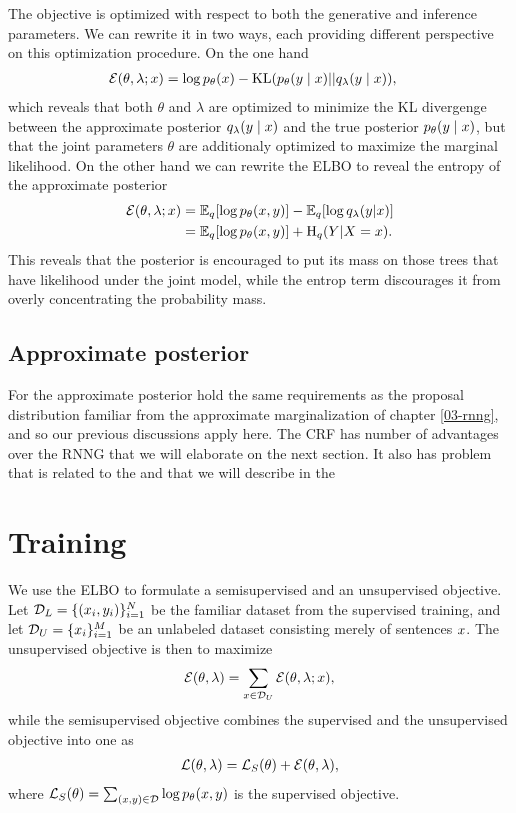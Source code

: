     The objective is optimized with respect to both the generative and inference parameters. We can rewrite it in two ways, each providing different perspective on this optimization procedure. On the one hand
    \begin{align*}
      \operatorname{\mathcal{E}}(\theta, \lambda; x) &= \log p_{\theta}(x) - \operatorname{KL}(p_{\theta}(y \mid x) \rvert\lvert q_{\lambda}(y \mid x)),
    \end{align*}
    which reveals that both $\theta$ and $\lambda$ are optimized to minimize the KL divergenge between the approximate posterior $q_{\lambda}(y \mid x)$ and the true posterior $p_{\theta}(y \mid x)$, but that the joint parameters $\theta$ are additionaly optimized to maximize the marginal likelihood. On the other hand we can rewrite the ELBO to reveal the entropy of the approximate posterior
    \begin{align}
      \operatorname{\mathcal{E}}(\theta, \lambda; x)
        &= \operatorname{\mathbb{E}}_q [ \log p_{\theta}( x, y ) ] - \operatorname{\mathbb{E}}_q [ \log q_{\lambda}(y | x) ]  \nonumber \\
        &= \operatorname{\mathbb{E}}_q [ \log p_{\theta}( x, y ) ] + \operatorname{H}_q(Y | X = x).
    \end{align}
    This reveals that the posterior is encouraged to put its mass on those trees that have likelihood under the joint model, while the entrop term discourages it from overly concentrating the probability mass.

  \subsection{Approximate posterior}
    For the approximate posterior hold the same requirements as the proposal distribution familiar from the approximate marginalization of chapter \ref{03-rnng}, and so our previous discussions apply here. The CRF has number of advantages over the RNNG that we will elaborate on the next section. It also has problem that is related to the and that we will describe in the


\section{Training}
  We use the ELBO to formulate a semisupervised and an unsupervised objective. Let $\mathcal{D}_L = \{ (x_i, y_i)\}_{i=1}^N$ be the familiar dataset from the supervised training, and let $\mathcal{D}_U = \{ x_i \}_{i=1}^M$ be an unlabeled dataset consisting merely of sentences $x$. The unsupervised objective is then to maximize
  \begin{align}
    \operatorname{\mathcal{E}}(\theta, \lambda) = \sum_{ x \in \mathcal{D}_U } \operatorname{\mathcal{E}}(\theta, \lambda; x),
  \end{align}
  while the semisupervised objective combines the supervised and the unsupervised objective into one as
  \begin{align*}
    \operatorname{\mathcal{L}}(\theta, \lambda) = \operatorname{\mathcal{L}}_{S}(\theta) + \operatorname{\mathcal{E}}(\theta, \lambda),
  \end{align*}
  where $\operatorname{\mathcal{L}}_{S}(\theta) = \sum_{ (x, y) \in \mathcal{D} } \log p_{\theta}(x, y)$ is the supervised objective.

